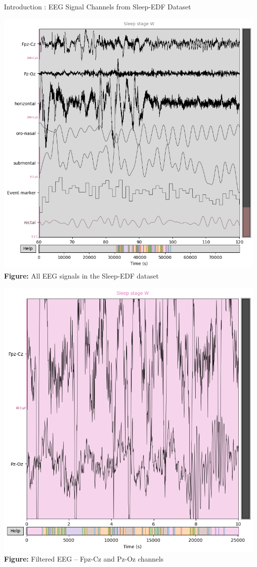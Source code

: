 \begin{frame}{Introduction : EEG Signal Channels from Sleep-EDF Dataset}
	\centering
	\begin{minipage}{0.4\linewidth}
		\centering
		\includegraphics[width=\linewidth]{images/paper_1/EDF Signals}
		\vspace{0.5em}
		\small\textbf{Figure:} All EEG signals in the Sleep-EDF dataset
	\end{minipage}
	\hfill
	\begin{minipage}{0.4\linewidth}
		\centering
		\includegraphics[width=\linewidth]{images/paper_1/EEG_Filter_chanel}
		\vspace{0.5em}
		\small\textbf{Figure:} Filtered EEG – Fpz-Cz and Pz-Oz channels
	\end{minipage}
\end{frame}
